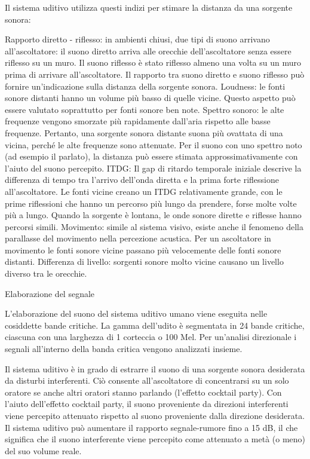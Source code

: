 Il sistema uditivo utilizza questi indizi per stimare la distanza da una sorgente sonora:

Rapporto diretto - riflesso: in ambienti chiusi, due tipi di suono arrivano
all'ascoltatore: il suono diretto arriva alle orecchie dell'ascoltatore senza
essere riflesso su un muro. Il suono riflesso è stato riflesso almeno una volta
su un muro prima di arrivare all'ascoltatore. Il rapporto tra suono diretto e
suono riflesso può fornire un'indicazione sulla distanza della sorgente sonora.
Loudness: le fonti sonore distanti hanno un volume più basso di quelle vicine.
Questo aspetto può essere valutato soprattutto per fonti sonore ben note.
Spettro sonoro: le alte frequenze vengono smorzate più rapidamente dall'aria
rispetto alle basse frequenze. Pertanto, una sorgente sonora distante suona più
ovattata di una vicina, perché le alte frequenze sono attenuate. Per il suono
con uno spettro noto (ad esempio il parlato), la distanza può essere stimata
approssimativamente con l'aiuto del suono percepito.
ITDG: Il gap di ritardo temporale iniziale descrive la differenza di tempo tra
l'arrivo dell'onda diretta e la prima forte riflessione all'ascoltatore. Le fonti
vicine creano un ITDG relativamente grande, con le prime riflessioni che hanno un
percorso più lungo da prendere, forse molte volte più a lungo. Quando la sorgente
è lontana, le onde sonore dirette e riflesse hanno percorsi simili.
Movimento: simile al sistema visivo, esiste anche il fenomeno della parallasse del
movimento nella percezione acustica. Per un ascoltatore in movimento le fonti
sonore vicine passano più velocemente delle fonti sonore distanti.
Differenza di livello: sorgenti sonore molto vicine causano un livello diverso
tra le orecchie.

Elaborazione del segnale

L'elaborazione del suono del sistema uditivo umano viene eseguita nelle cosiddette
bande critiche. La gamma dell'udito è segmentata in 24 bande critiche, ciascuna con
una larghezza di 1 corteccia o 100 Mel. Per un'analisi direzionale i segnali
all'interno della banda critica vengono analizzati insieme.

Il sistema uditivo è in grado di estrarre il suono di una sorgente sonora desiderata
da disturbi interferenti. Ciò consente all'ascoltatore di concentrarsi su un solo
oratore se anche altri oratori stanno parlando (l'effetto cocktail party). Con
l'aiuto dell'effetto cocktail party, il suono proveniente da direzioni interferenti
viene percepito attenuato rispetto al suono proveniente dalla direzione desiderata.
Il sistema uditivo può aumentare il rapporto segnale-rumore fino a 15 dB, il che
significa che il suono interferente viene percepito come attenuato a metà (o meno)
del suo volume reale.

